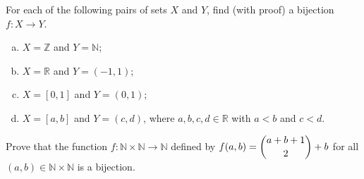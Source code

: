 \begin{chapex}
For each of the following pairs of sets $X$ and $Y$, find (with proof) a bijection $f : X \to Y$.
\begin{enumerate}[(a)]
\item $X = \mathbb{Z}$ and $Y = \mathbb{N}$;
\item $X = \mathbb{R}$ and $Y = (-1,1)$;
\item $X = [0,1]$ and $Y = (0,1)$;
\item $X = [a,b]$ and $Y = (c,d)$, where $a,b,c,d \in \mathbb{R}$ with $a<b$ and $c<d$.
\end{enumerate}
\end{chapex}

\begin{chapex}
Prove that the function $f : \mathbb{N} \times \mathbb{N} \to \mathbb{N}$ defined by $f(a,b) = \dbinom{a+b+1}{2} + b$ for all $(a,b) \in \mathbb{N} \times \mathbb{N}$ is a bijection.
\end{chapex}
